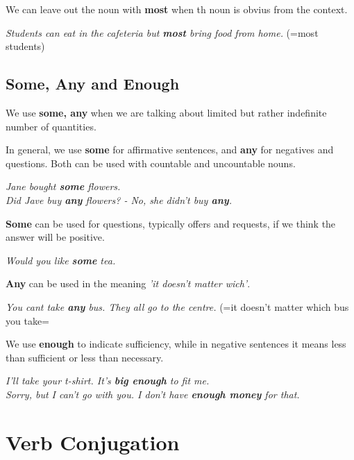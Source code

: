 \documentclass[hidelinks,10pt,a4paper]{article}
\begin{document}
We can leave out the noun with \textbf{most} when th noun is obvius from the context.

\begin{center}
	\textit{Students can eat in the cafeteria but \textbf{most} bring food from home.} (=most students)
\end{center}

\subsection{Some, Any and Enough}

We use \textbf{some, any} when we are talking about limited but rather indefinite number of quantities.

In general, we use \textbf{some} for affirmative sentences, and \textbf{any} for negatives and questions. Both can be used with countable and uncountable nouns.
\begin{center}
	\textit{Jane bought \textbf{some} flowers. \\
	Did Jave buy \textbf{any} flowers? - No, she didn't buy \textbf{any}. }
\end{center}

\textbf{Some} can be used for questions, typically offers and requests, if we think the answer will be positive.

\begin{center}
	\textit{Would you like \textbf{some} tea.}
\end{center}

\textbf{Any} can be used in the meaning \textit{'it doesn't matter wich'}.

\begin{center}
	\textit{You cant take \textbf{any} bus. They all go to the centre.} (=it doesn't matter which bus you take=
\end{center}

We use \textbf{enough} to indicate sufficiency, while in negative sentences it means less than sufficient or less than necessary.
\begin{center}
	\textit{I'll take your t-shirt. It's \textbf{big enough} to fit me. \\
	Sorry, but I can't go with you. I don't have \textbf{enough money} for that. }
\end{center}

\section{Verb Conjugation}
\end{document}
